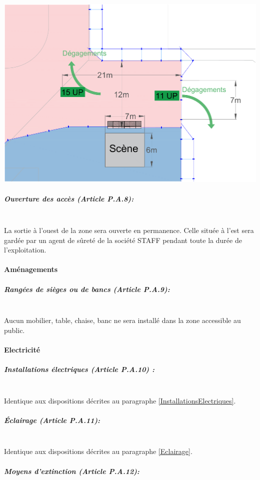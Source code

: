 \documentclass[hidelinks, paper=a4, fontsize=13pt]{report}
\begin{document}
\begin{center}
	\includegraphics[width=.8\textwidth,keepaspectratio]{Exports/Plan_24h_44eme-3e_Scene_Cotes}
\end{center}
\subparagraph*{Ouverture des accès (Article P.A.8):}\mbox{}\\
La sortie à l'ouest de la zone sera ouverte en permanence. Celle située à l'est sera gardée par un agent de sûreté de la société STAFF pendant toute la durée de l'exploitation.

\paragraph{Aménagements}

\subparagraph*{Rangées de sièges ou de bancs (Article P.A.9):}\mbox{}\\

Aucun mobilier, table, chaise, banc ne sera installé dans la zone accessible au public.

\paragraph{Electricité}

\subparagraph*{Installations électriques (Article P.A.10) :}\mbox{}\\

Identique aux dispositions décrites au paragraphe \ref{InstallationsElectriques}.

\subparagraph*{Éclairage (Article P.A.11):}\mbox{}\\

Identique aux dispositions décrites au paragraphe \ref{Eclairage}.

\subparagraph*{Moyens d'extinction (Article P.A.12):}\mbox{}\\
\end{document}
